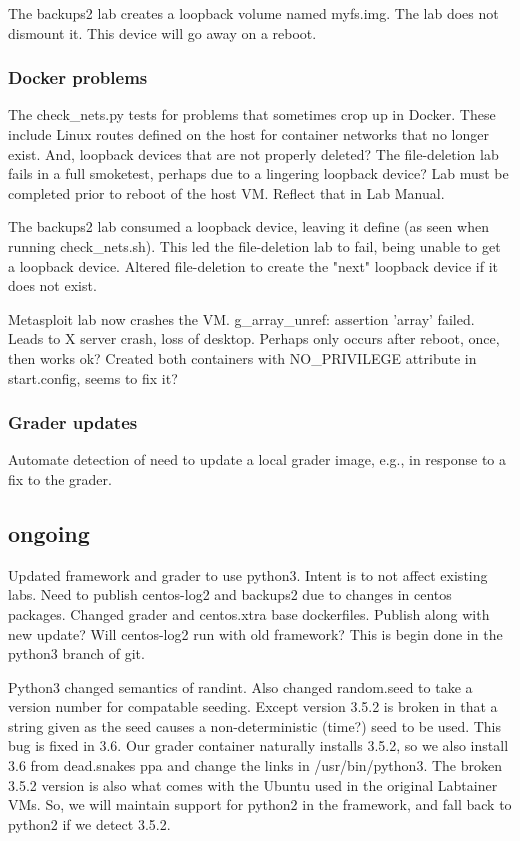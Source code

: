 \documentclass[12pt]{article}
\begin{document}
The backups2 lab creates a loopback volume named myfs.img.  The lab does not dismount it.
This device will go away on a reboot.

\subsubsection{Docker problems}
The check\_nets.py tests for problems that sometimes crop up in Docker.  These include Linux routes defined
on the host for container networks that no longer exist.  And, loopback devices that are not properly deleted?
The file-deletion lab fails in a full smoketest, perhaps due to a lingering loopback device?
Lab must be completed prior to reboot of the host VM. Reflect that in Lab Manual.

The backups2 lab consumed a loopback device, leaving it define (as seen when running check\_nets.sh).  This
led the file-deletion lab to fail, being unable to get a loopback device.  Altered file-deletion to create the
"next" loopback device if it does not exist.

Metasploit lab now crashes the VM.  g\_array\_unref: assertion 'array' failed.   Leads to X server crash, loss of
desktop.  Perhaps only occurs after reboot, once, then works ok?  Created both containers with NO\_PRIVILEGE attribute
in start.config, seems to fix it?

\subsubsection{Grader updates}
Automate detection of need to update a local grader image, e.g., in response to a fix to the grader.

\subsection{ongoing}
Updated framework and grader to use python3.  Intent is to not affect existing labs.  Need to publish centos-log2 and
backups2 due to changes in centos packages.  Changed grader and centos.xtra base dockerfiles.
Publish along with new update?   Will centos-log2 run with old framework?
This is begin done in the python3 branch of git.

Python3 changed semantics of randint.  Also changed random.seed to take a version number for compatable seeding.
Except version 3.5.2 is broken in that a string given as the seed causes a non-deterministic (time?) seed to be used.
This bug is fixed in 3.6.  Our grader container naturally installs 3.5.2, so we also install 3.6 from dead.snakes ppa
and change the links in /usr/bin/python3. The broken 3.5.2 version is also what comes with the Ubuntu used in the original
Labtainer VMs.  So, we will maintain support for python2 in the framework, and fall back to python2 if we detect 3.5.2.
\end{document}

